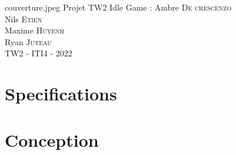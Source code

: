 \documentclass[11pt,a4paper]{article}
\author{ADC-NE-MH-RJ}
\begin{document}
\PageDeGarde
{couverture.jpeg} %
{Projet TW2} %
{Idle Game :} %
{
Ambre \textsc{De crescenzo}\\
Nils \textsc{Etien}\\
Maxime \textsc{Huyenh}\\%
Ryan \textsc{Juteau}\\
}
{TW2 - ITI4 - 2022} %



\tableofcontents

\clearpage




\clearpage

\section{Specifications}



\clearpage


\clearpage


\clearpage


\clearpage

\section{Conception}



\clearpage


\clearpage


\clearpage

\end{document}
